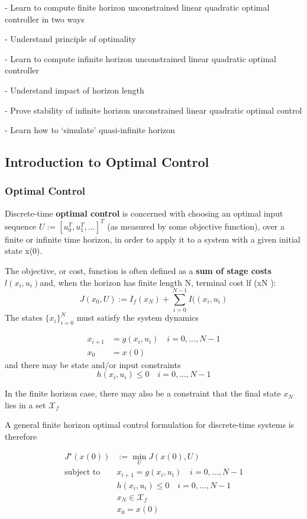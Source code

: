 - Learn to compute finite horizon
unconstrained linear quadratic optimal controller in two ways

- Understand principle of optimality

- Learn to compute infinite horizon
unconstrained linear quadratic optimal controller

- Understand impact of horizon length

- Prove stability of infinite horizon
unconstrained linear quadratic optimal control

- Learn how to ‘simulate’ quasi-infinite horizon

\subsection{Introduction to Optimal Control}

\subsubsection{Optimal Control}
Discrete-time \textbf{optimal control} is concerned with
choosing an optimal input sequence
$U := [u_0^T, u_1^T,...]^T$ %
(as measured by some objective function),
over a finite or infinite time horizon,
in order to apply it to a system with a given initial state x(0).

The objective, or cost, function is often defined as a
\textbf{sum of stage costs} $l(x_i,u_i)$and,
when the horizon has finite length N,
terminal cost lf (xN ):
$$
	J(x_0,U) :=  I_f(x_N) +
	\sum_{i=0}^{N-1}I((x_i,u_i)
$$
The states $\{x_i\}_{i=0}^N$ must satisfy the system dynamics

$$\begin{aligned}
		x_{i+1} & = g(x_i,u_i )
		\quad i = 0,\dots,N-1   \\
		x_0     & = x(0)
	\end{aligned}$$
and there may be state and/or input constraints
$$
	h(x_i,u_i)\le 0
	\quad i = 0,\dots,N-1
$$

In the finite horizon case,
there may also be a constraint that
the final state $x_N$ lies in a set $\mathcal{X}_f$

A general finite horizon optimal control formulation
for discrete-time systems is therefore

$$\begin{aligned}
		J^\star(x(0)) & :=  \min_{U}J(x(0),U)                    \\
		\text{subject to  }
		              & x_{i+1}                = g(x_i,u_i )
		\quad i  = 0,\dots,N-1                                   \\
		              & h(x_i,u_i)             \le 0
		\quad i  = 0,\dots,N-1                                   \\
		              & x_N                    \in \mathcal{X}_f \\
		              & x_0                    = x(0)
	\end{aligned}$$



